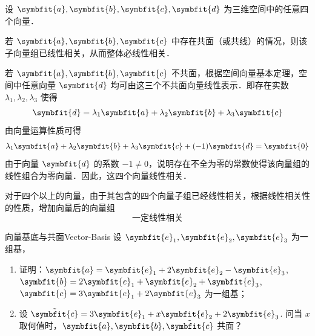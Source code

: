 \begin{myproof}
    设 $\symbfit{a}, \symbfit{b}, \symbfit{c}, \symbfit{d}$ 为三维空间中的任意四个向量．

    若 $\symbfit{a}, \symbfit{b}, \symbfit{c}$ 中存在共面（或共线）的情况，则该子向量组已线性相关，从而整体必线性相关．

    若 $\symbfit{a}, \symbfit{b}, \symbfit{c}$ 不共面，根据空间向量基本定理，空间中任意向量 $\symbfit{d}$ 均可由这三个不共面向量线性表示．即存在实数 $\lambda_1, \lambda_2, \lambda_3$ 使得
    \begin{equation}
        \symbfit{d} = \lambda_1\symbfit{a} + \lambda_2\symbfit{b} + \lambda_3\symbfit{c}
    \end{equation}
    由向量运算性质可得
    \begin{equation}
        \lambda_1\symbfit{a} + \lambda_2\symbfit{b} + \lambda_3\symbfit{c} + (-1)\symbfit{d} = \symbfit{0}
    \end{equation}
    由于向量 $\symbfit{d}$ 的系数 $-1 \neq 0$，说明存在不全为零的常数使得该向量组的线性组合为零向量．因此，这四个向量线性相关．

    对于四个以上的向量，由于其包含的四个向量子组已经线性相关，根据线性相关性的性质，增加向量后的向量组
    \begin{equation}
        \boxed{\text{一定线性相关}}
    \end{equation}
\end{myproof}


\begin{problem}{向量基底与共面}{Vector-Basis}
    设 $\symbfit{e}_1, \symbfit{e}_2, \symbfit{e}_3$ 为一组基，
    \begin{enumerate}
        \item 证明：$\symbfit{a} = \symbfit{e}_1 + 2\symbfit{e}_2 - \symbfit{e}_3$, $\symbfit{b} = 2\symbfit{e}_1 + \symbfit{e}_2 + \symbfit{e}_3$, $\symbfit{c} = 3\symbfit{e}_1 + 2\symbfit{e}_3$ 为一组基；
        \item 设 $\tilde{\symbfit{c}} = 3\symbfit{e}_1 + x\symbfit{e}_2 + 2\symbfit{e}_3$. 问当 $x$ 取何值时，$\symbfit{a}, \symbfit{b}, \tilde{\symbfit{c}}$ 共面？
    \end{enumerate}
\end{problem}

